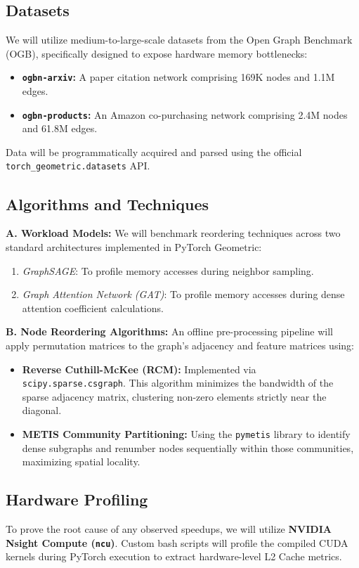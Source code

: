 \documentclass[sigconf,review]{acmart}
\begin{document}
\subsection{Datasets}
We will utilize medium-to-large-scale datasets from the Open Graph Benchmark (OGB), specifically designed to expose hardware memory bottlenecks:
\begin{itemize}
    \item \textbf{\texttt{ogbn-arxiv}:} A paper citation network comprising 169K nodes and 1.1M edges.
    \item \textbf{\texttt{ogbn-products}:} An Amazon co-purchasing network comprising 2.4M nodes and 61.8M edges.
\end{itemize}
Data will be programmatically acquired and parsed using the official \texttt{torch\_geometric.datasets} API.

\subsection{Algorithms and Techniques}
\textbf{A. Workload Models:} We will benchmark reordering techniques across two standard architectures implemented in PyTorch Geometric:
\begin{enumerate}
    \item \textit{GraphSAGE}: To profile memory accesses during neighbor sampling.
    \item \textit{Graph Attention Network (GAT)}: To profile memory accesses during dense attention coefficient calculations.
\end{enumerate}

\textbf{B. Node Reordering Algorithms:} An offline pre-processing pipeline will apply permutation matrices to the graph's adjacency and feature matrices using:
\begin{itemize}
    \item \textbf{Reverse Cuthill-McKee (RCM):} Implemented via \texttt{scipy.sparse.csgraph}. This algorithm minimizes the bandwidth of the sparse adjacency matrix, clustering non-zero elements strictly near the diagonal.
    \item \textbf{METIS Community Partitioning:} Using the \texttt{pymetis} library to identify dense subgraphs and renumber nodes sequentially within those communities, maximizing spatial locality.
\end{itemize}

\subsection{Hardware Profiling}
To prove the root cause of any observed speedups, we will utilize \textbf{NVIDIA Nsight Compute (\texttt{ncu})}. Custom bash scripts will profile the compiled CUDA kernels during PyTorch execution to extract hardware-level L2 Cache metrics.
\end{document}
